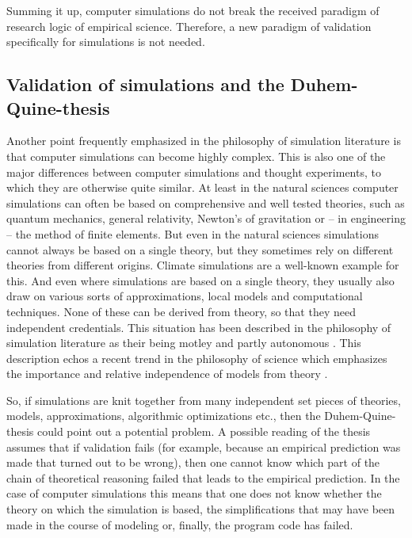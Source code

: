 \documentclass[12pt, a4paper]{article}
\begin{document}
Summing it up, computer simulations do not break the received paradigm
of research logic of empirical science. Therefore, a new paradigm of
validation specifically for simulations is not needed.

\subsection{Validation of simulations and the Duhem-Quine-thesis}

Another point frequently emphasized in the philosophy of simulation
literature is that computer simulations can become highly complex.
This is also one of the major differences between computer simulations
and thought experiments, to which they are otherwise quite similar. At
least in the natural sciences computer simulations can often be based
on comprehensive and well tested theories, such as quantum mechanics,
general relativity, Newton's of gravitation or -- in engineering --
the method of finite elements. But even in the natural sciences
simulations cannot always be based on a single theory, but they
sometimes rely on different theories from different origins. Climate
simulations are a well-known example for this. And even where
simulations are based on a single theory, they usually also draw on
various sorts of approximations, local models and computational
techniques. None of these can be derived from theory, so that they
need independent credentials. This situation has been described in the
philosophy of simulation literature as their being motley and partly
autonomous \citep{winsberg:2003}. This description echos a recent
trend in the philosophy of science which emphasizes the importance and
relative independence of models from theory
\citep{morgan-morrison:1999, cartwright:1983}.

So, if simulations are knit together from many independent set pieces
of theories, models, approximations, algorithmic optimizations etc.,
then the Duhem-Quine-thesis could point out a potential problem. A
possible reading of the thesis assumes that if validation fails (for
example, because an empirical prediction was made that turned out to
be wrong), then one cannot know which part of the chain of theoretical
reasoning failed that leads to the empirical prediction. In the case
of computer simulations this means that one does not know whether the
theory on which the simulation is based, the simplifications that may
have been made in the course of modeling or, finally, the program code
has failed.
\end{document}
